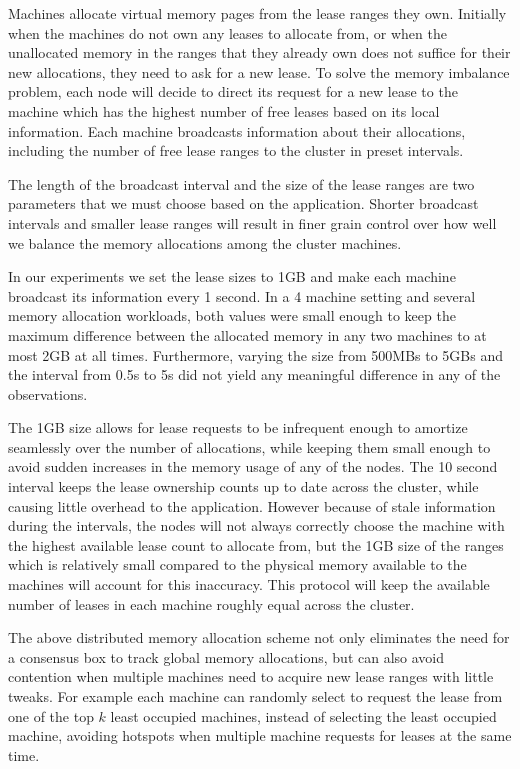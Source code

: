 Machines allocate virtual memory pages from the lease ranges they own. Initially
when
the machines do not own any leases to allocate from, or when the unallocated
memory in the
ranges that they already own does not suffice for their new allocations, they
need to ask for a new lease. To solve the memory imbalance problem, each node
will decide to direct its request for a new lease to the machine which
has the highest number of free leases based on its local information.
Each machine broadcasts information about their allocations, including
the number of free lease ranges to the cluster in preset intervals.

The length of the broadcast interval and the size of the lease ranges are two
parameters that we must choose based on the application. Shorter broadcast
intervals and smaller lease ranges will result in finer grain control over
how well we balance the memory allocations among the cluster machines.

In our experiments we set the lease sizes to 1GB and
make each machine broadcast its information every 1 second. In a 4 machine
setting and several memory allocation workloads, both values were small enough
to keep the maximum difference between the
allocated memory in any two machines to at most 2GB at all times.
Furthermore, varying the size from
500MBs to 5GBs and the interval from 0.5s to 5s did not yield any meaningful
difference in any of the observations.


The 1GB size allows for lease requests to be infrequent enough to amortize
seamlessly over the number of allocations, while keeping them small enough
to avoid sudden increases in the memory usage of any of the nodes. The 10
second interval keeps the lease ownership counts up to date across the cluster,
while causing little overhead to the application. However because of stale
information during the intervals, the nodes will not always
correctly choose the machine with the highest available lease count to allocate
from, but the 1GB size of the ranges which is relatively small compared to the
physical memory available to the machines will account for this inaccuracy.
This protocol
will keep the available number of leases in each machine roughly equal across
the cluster.

The above distributed memory allocation scheme not only eliminates the need for
a consensus box to track global memory allocations, but can also avoid
contention when multiple machines need to acquire new lease ranges with
little tweaks. For example each machine can randomly select to request the
lease from one of the top $k$ least occupied machines, instead of selecting
the least occupied machine, avoiding hotspots when multiple machine requests
for leases at the same time.

